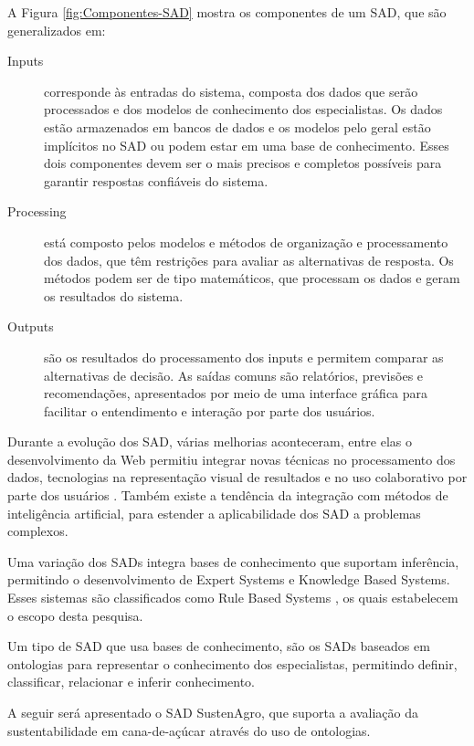 A Figura \ref{fig:Componentes-SAD} mostra os componentes de um SAD,
que são generalizados em:
\begin{description}
\item [{I\foreignlanguage{english}{nputs}}] corresponde às entradas do
sistema, composta dos dados que serão processados e dos modelos de
conhecimento dos especialistas. Os dados estão armazenados em bancos
de dados e os modelos pelo geral estão implícitos no SAD ou podem
estar em uma base de conhecimento. Esses dois componentes devem ser
o mais precisos e completos possíveis para garantir respostas confiáveis
do sistema.
%
\item [{Processing}] \foreignlanguage{brazil}{está composto pelos modelos
e métodos de organização e processamento dos dados, que têm restrições
para avaliar as alternativas de resposta. Os métodos podem ser de
tipo matemáticos, que processam os dados e geram os resultados do
sistema.}
\item [{Outputs}] \foreignlanguage{brazil}{são os resultados do processamento
dos inputs e permitem comparar as alternativas de decisão. As saídas
comuns são relatórios, previsões e recomendações, apresentados por
meio de uma interface gráfica para facilitar o entendimento e interação
por parte dos usuários.}
\end{description}
Durante a evolução dos SAD, várias melhorias aconteceram, entre elas
o desenvolvimento da Web permitiu integrar novas técnicas no processamento
dos dados, tecnologias na representação visual de resultados e no
uso colaborativo por parte dos usuários \citep{Shim2002}. Também
existe a tendência da integração com métodos de inteligência artificial,
para estender a aplicabilidade dos SAD a problemas complexos. 

Uma variação dos SADs integra bases de conhecimento que suportam inferência,
permitindo o desenvolvimento de \foreignlanguage{english}{Expert Systems}
e \foreignlanguage{english}{Knowledge Based Systems.} Esses sistemas
são classificados como \foreignlanguage{english}{Rule Based Systems}
\citep{Tweedale2016}, os quais estabelecem o escopo desta pesquisa. 

Um tipo de SAD que usa bases de conhecimento, são os SADs baseados
em ontologias para representar o conhecimento dos especialistas, permitindo
definir, classificar, relacionar e inferir conhecimento. 

A seguir será apresentado o SAD SustenAgro, que suporta a avaliação
da sustentabilidade em cana-de-açúcar através do uso de ontologias.

